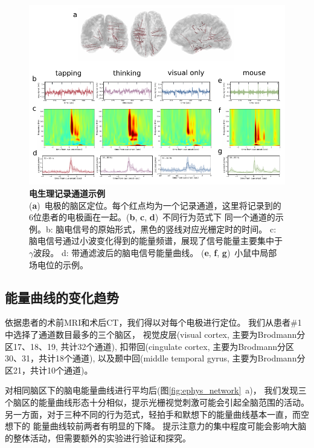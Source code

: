 \begin{figure}[h]
    \centering
    \includegraphics[width=\textwidth]{src/figures/ephys_examples.pdf}
    \caption{\textbf{电生理记录通道示例}\\
    (\textbf{a})~电极的脑区定位。每个红点均为一个记录通道，这里将记录到的
    6位患者的电极画在一起。(\textbf{b}, \textbf{c}, \textbf{d})~不同行为范式下
    同一个通道的示例。b: 脑电信号的原始形式，黑色的竖线对应光栅定时的时间。
    c: 脑电信号通过小波变化得到的能量频谱，展现了信号能量主要集中于\(\gamma\)波段。
    d: 带通滤波后的脑电信号能量曲线。
    (\textbf{e}, \textbf{f}, \textbf{g})~小鼠中局部场电位的示例。}
    \label{fig:ephys_example}
\end{figure}

\subsection{能量曲线的变化趋势}
依据患者的术前MRI和术后CT，我们得以对每个电极进行定位。
我们从患者\#1中选择了通道数目最多的三个脑区，
视觉皮层(visual cortex, 主要为Brodmann分区17、18、19, 共计32个通道),
扣带回(cingulate cortex, 主要为Brodmann分区30、31，共计18个通道),
以及颞中回(middle temporal gyrus, 主要为Brodmann分区21，共计10个通道)。

对相同脑区下的脑电能量曲线进行平均后(图\ref{fig:ephys_network}~a)，
我们发现三个脑区的能量曲线形态十分相似，提示光栅视觉刺激可能会引起全脑范围的活动。
另一方面，对于三种不同的行为范式，轻拍手和默想下的能量曲线基本一直，而空想下的
能量曲线较前两者有明显的下降。%
提示注意力的集中程度可能会影响大脑的整体活动，但需要额外的实验进行验证和探究。


